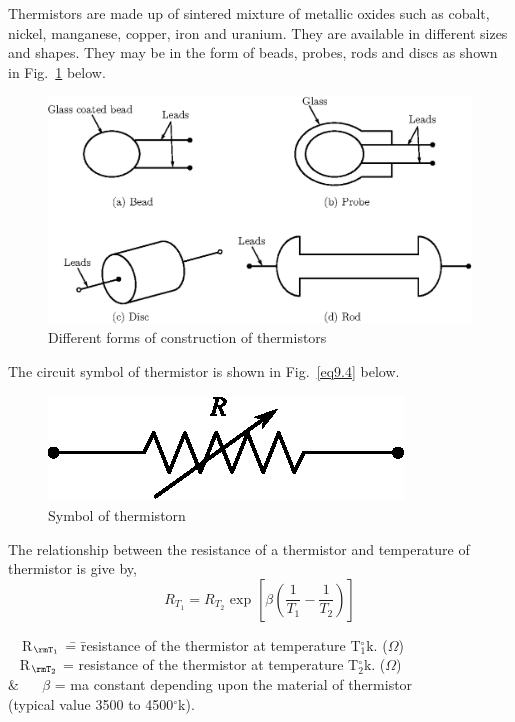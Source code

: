  Thermistors are made up of sintered mixture of
metallic oxides such as cobalt, nickel, manganese, copper, iron and
uranium. They are available in different sizes and shapes. They may be
in the form of beads, probes, rods and discs as shown in
Fig.~\ref{fig9.3} below.
\begin{figure}[H]
\centering
\includegraphics[scale=.97]{chap9/fig9.2.eps}
\caption{Different forms of construction of thermistors}\label{fig9.3}
\end{figure}

The circuit symbol of thermistor is shown in Fig.~\ref{eq9.4} below.
\begin{figure}[H]
\centering
\includegraphics[scale=.97]{chap9/fig9.3.eps}
\caption{Symbol of thermistorn}\label{fig9.4}
\end{figure}

\vfill\eject


The relationship between the resistance of a thermistor and
temperature of thermistor is give by,
\begin{equation}
R_{T_1} = R_{T_2} \text{ exp } \left[\beta \left(\dfrac{1}{T_1}
- \dfrac{1}{T_2} \right) \right] \label{eq9.4}
\end{equation}
\begin{tabbing}
 ~~R$_{\rmT_1}$ \= = \=  resistance of the thermistor at
temperature T$_1^\circ$k. ($\Omega$)\\[4pt]
\qquad\quad~ R$_{\rmT_2}$ \> = \> resistance of the thermistor at  temperature
T$^\circ_2$k. ($\Omega$)\\[4pt]
\quad\quad \& ~~ $\beta$ \> = \> ma constant depending upon the material of
thermistor\\[4pt]
\> \> \quad  (typical value 3500 to 4500$^\circ$k).
\end{tabbing}

